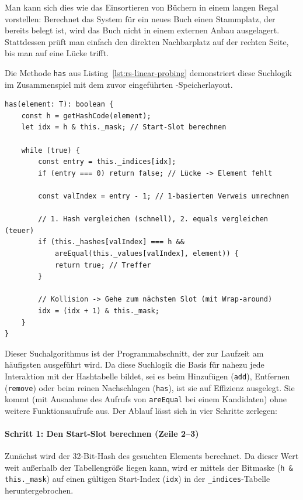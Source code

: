 Man kann sich dies wie das Einsortieren von Büchern in einem langen Regal vorstellen: Berechnet das System für ein neues Buch einen Stammplatz, der bereits belegt ist, wird das Buch nicht in einem externen Anbau ausgelagert. Stattdessen prüft man einfach den direkten Nachbarplatz auf der rechten Seite, bis man auf eine Lücke trifft. 

Die Methode \texttt{has} aus Listing~\ref{lst:rs-linear-probing} demonstriert diese Suchlogik im Zusammenspiel mit dem zuvor eingeführten -Speicherlayout.

\begin{listing}[ht]
    \caption{ am Beispiel der \texttt{has}-Methode}
    \label{lst:rs-linear-probing}
    \begin{verbatim}
has(element: T): boolean {
    const h = getHashCode(element);
    let idx = h & this._mask; // Start-Slot berechnen
    
    while (true) {
        const entry = this._indices[idx];
        if (entry === 0) return false; // Lücke -> Element fehlt
        
        const valIndex = entry - 1; // 1-basierten Verweis umrechnen
        
        // 1. Hash vergleichen (schnell), 2. equals vergleichen (teuer)
        if (this._hashes[valIndex] === h && 
            areEqual(this._values[valIndex], element)) {
            return true; // Treffer
        }
        
        // Kollision -> Gehe zum nächsten Slot (mit Wrap-around)
        idx = (idx + 1) & this._mask; 
    }
}
    \end{verbatim}
\end{listing}

Dieser Suchalgorithmus ist der Programmabschnitt, der zur Laufzeit am häufigsten ausgeführt wird. Da diese Suchlogik die Basis für nahezu jede Interaktion mit der Hashtabelle bildet, sei es beim Hinzufügen (\texttt{add}), Entfernen (\texttt{remove}) oder beim reinen Nachschlagen (\texttt{has}), ist sie auf Effizienz ausgelegt. Sie kommt (mit Ausnahme des Aufrufs von \texttt{areEqual} bei einem Kandidaten) ohne weitere Funktionsaufrufe aus. Der Ablauf lässt sich in vier Schritte zerlegen:

\paragraph*{Schritt 1: Den Start-Slot berechnen (Zeile 2–3)}
Zunächst wird der 32-Bit-Hash des gesuchten Elements berechnet. Da dieser Wert weit außerhalb der Tabellengröße liegen kann, wird er mittels der Bitmaske (\texttt{h & this._mask}) auf einen gültigen Start-Index (\texttt{idx}) in der \texttt{_indices}-Tabelle heruntergebrochen.

